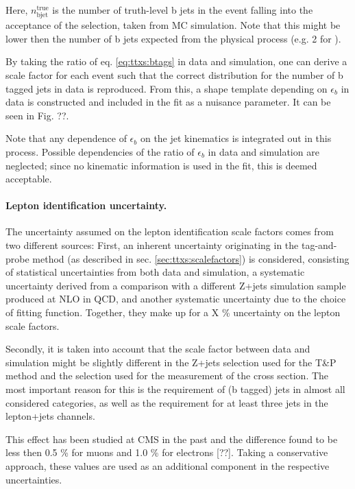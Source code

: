 Here, $n_{\mathrm{b jet}}^{\mathrm{true}}$ is the number of truth-level b jets in the event falling into the acceptance of the selection, taken from MC simulation. Note that this might be lower then the number of b jets expected from the physical process (e.g. 2 for \ttbar). 

By taking the ratio of eq. \ref{eq:ttxs:btags} in data and simulation, one can derive a scale factor for each event such that the correct distribution for the number of b tagged jets in data is reproduced. From this, a shape template depending on $\epsilon_b$ in data is constructed and included in the fit as a nuisance parameter. It can be seen in Fig. ??.

Note that any dependence of $\epsilon_b$ on the jet kinematics is integrated out in this process. Possible dependencies of the ratio of $\epsilon_b$ in data and simulation are neglected; since no kinematic information is used in the fit, this is deemed acceptable.

\paragraph{Lepton identification uncertainty.}


The uncertainty assumed on the lepton identification scale factors comes from two different sources: First, an inherent uncertainty originating in the tag-and-probe method (as described in sec. \ref{sec:ttxs:scalefactors}) is considered, consisting of statistical uncertainties from both data and simulation, a systematic uncertainty derived from a comparison with a different Z+jets simulation sample produced at NLO in QCD, and another systematic uncertainty due to the choice of fitting function. Together, they make up for a X \% uncertainty on the lepton scale factors.

Secondly, it is taken into account that the scale factor between data and simulation might be slightly different in the Z+jets selection used for the T\&P method and the \ttbar selection used for the measurement of the cross section. The most important reason for this is the requirement of (b tagged) jets in almost all considered categories, as well as the requirement for at least three jets in the lepton+jets channels. 

This effect has been studied at CMS in the past and the difference found to be less then 0.5 \% for muons and 1.0 \% for electrons [??]. Taking a conservative approach, these values are used as an additional component in the respective uncertainties.

